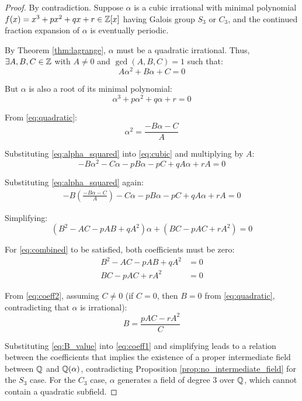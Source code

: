 \begin{proof}
By contradiction. Suppose $\alpha$ is a cubic irrational with minimal polynomial $f(x) = x^3 + px^2 + qx + r \in \mathbb{Z}[x]$ having Galois group $S_3$ or $C_3$, and the continued fraction expansion of $\alpha$ is eventually periodic.

By Theorem \ref{thm:lagrange}, $\alpha$ must be a quadratic irrational. Thus, $\exists A, B, C \in \mathbb{Z}$ with $A \neq 0$ and $\gcd(A, B, C) = 1$ such that:
\begin{equation}\label{eq:quadratic}
A\alpha^2 + B\alpha + C = 0
\end{equation}

But $\alpha$ is also a root of its minimal polynomial:
\begin{equation}\label{eq:cubic}
\alpha^3 + p\alpha^2 + q\alpha + r = 0
\end{equation}

From \eqref{eq:quadratic}:
\begin{equation}\label{eq:alpha_squared}
\alpha^2 = \frac{-B\alpha - C}{A}
\end{equation}

Substituting \eqref{eq:alpha_squared} into \eqref{eq:cubic} and multiplying by $A$:
\begin{equation}
-B\alpha^2 - C\alpha - pB\alpha - pC + qA\alpha + rA = 0
\end{equation}

Substituting \eqref{eq:alpha_squared} again:
\begin{align*}
-B\left(\frac{-B\alpha - C}{A}\right) - C\alpha - pB\alpha - pC + qA\alpha + rA = 0
\end{align*}

Simplifying:
\begin{equation}\label{eq:combined}
(B^2 - AC - pAB + qA^2)\alpha + (BC - pAC + rA^2) = 0
\end{equation}

For \eqref{eq:combined} to be satisfied, both coefficients must be zero:
\begin{align}
B^2 - AC - pAB + qA^2 &= 0 \label{eq:coeff1}\\
BC - pAC + rA^2 &= 0 \label{eq:coeff2}
\end{align}

From \eqref{eq:coeff2}, assuming $C \neq 0$ (if $C = 0$, then $B = 0$ from \eqref{eq:quadratic}, contradicting that $\alpha$ is irrational):
\begin{equation}\label{eq:B_value}
B = \frac{pAC - rA^2}{C}
\end{equation}

Substituting \eqref{eq:B_value} into \eqref{eq:coeff1} and simplifying leads to a relation between the coefficients that implies the existence of a proper intermediate field between $\mathbb{Q}$ and $\mathbb{Q}(\alpha)$, contradicting Proposition \ref{prop:no_intermediate_field} for the $S_3$ case. For the $C_3$ case, $\alpha$ generates a field of degree 3 over $\mathbb{Q}$, which cannot contain a quadratic subfield.
\end{proof}


